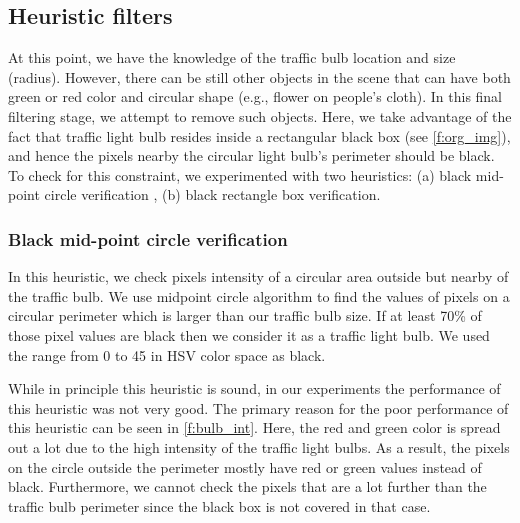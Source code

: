 \subsection{Heuristic filters}
\label{s:filter}
At this point, we have the knowledge of the traffic bulb location and size (radius).
However, there can be still other objects in the scene that can have both green or red color and circular shape (e.g., flower on people's cloth).
In this final filtering stage, we attempt to remove such objects. 
Here, we take advantage of the fact that traffic light bulb resides inside a rectangular black box (see \ref{f:org_img}), and hence the pixels nearby the circular light bulb's perimeter should be black.
To check for this constraint, we experimented with two heuristics: (a) black mid-point circle verification , (b) black rectangle box verification.

\subsubsection{Black mid-point circle verification}
In this heuristic, we check pixels intensity of a circular area outside but nearby of the traffic bulb.
We use midpoint circle algorithm to find the values of pixels on a circular perimeter which is larger than our traffic bulb size.
If at least 70\% of those pixel values are black then we consider it as a traffic light bulb.
We used the range from 0 to 45 in HSV color space as black.

While in principle this heuristic is sound, in our experiments the performance of this heuristic was not very good. 
The primary reason for the poor performance of this heuristic can be seen in \ref{f:bulb_int}.
Here, the red and green color is spread out a lot due to the high intensity of the traffic light bulbs. 
As a result, the pixels on the circle outside the perimeter mostly have red or green values instead of black.
Furthermore, we cannot check the pixels that are a lot further than the traffic bulb perimeter since the black box is not covered in that case.


